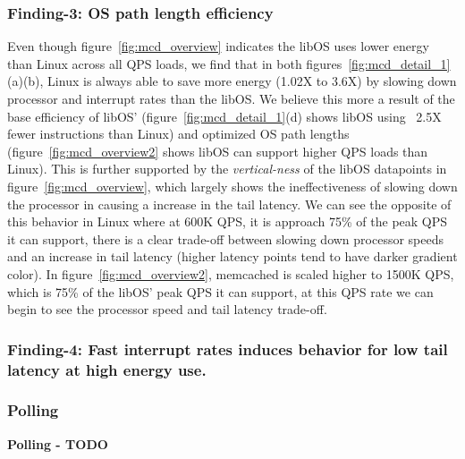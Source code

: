 
\subsubsection{Finding-3: OS path length efficiency} \label{sec:f3}
Even though figure~\ref{fig:mcd_overview} indicates the libOS uses lower energy than Linux across all QPS loads, we find that in both figures~\ref{fig:mcd_detail_1}(a)(b), Linux is always able to save more energy (1.02X to 3.6X) by slowing down processor and interrupt rates than the libOS. We believe this more a result of the base efficiency of libOS' (figure~\ref{fig:mcd_detail_1}(d) shows libOS using ~2.5X fewer instructions than Linux) and optimized OS path lengths (figure~\ref{fig:mcd_overview2} shows libOS can support higher QPS loads than Linux). This is further supported by the \textit{vertical-ness} of the libOS datapoints in figure~\ref{fig:mcd_overview}, which largely shows the ineffectiveness of slowing down the processor in causing a increase in the tail latency. We can see the opposite of this behavior in Linux where at 600K QPS, it is approach 75\% of the peak QPS it can support, there is a clear trade-off between slowing down processor speeds and an increase in tail latency (higher latency points tend to have darker gradient color). In figure~\ref{fig:mcd_overview2}, memcached is scaled higher to 1500K QPS, which is 75\% of the libOS' peak QPS it can support, at this QPS rate we can begin to see the processor speed and tail latency trade-off.

\subsubsection{Finding-4: Fast interrupt rates induces behavior for low tail latency at high energy use.} \label{sec:f4}

\subsubsection{Polling}
\textbf{Polling - TODO}
